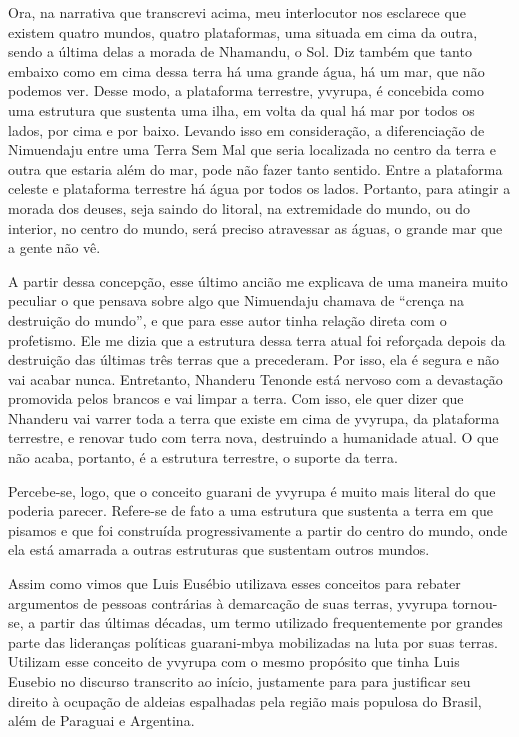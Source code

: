 \documentclass{article}
\begin{document}
Ora, na narrativa que transcrevi acima, meu interlocutor nos esclarece
que existem quatro mundos, quatro plataformas, uma situada em cima da
outra, sendo a \'ultima delas a morada de Nhamandu, o Sol. Diz tamb\'em
que tanto embaixo como em cima dessa terra h\'a uma grande \'agua, h\'a
um mar, que n\~ao podemos ver. Desse modo, a plataforma terrestre,
yvyrupa, \'e concebida como uma estrutura que sustenta uma ilha, em
volta da qual h\'a mar por todos os lados, por cima e por baixo.
Levando isso em considera\c{c}\~ao, a diferencia\c{c}\~ao de Nimuendaju
entre uma Terra Sem Mal que seria localizada no centro da terra e outra
que estaria al\'em do mar, pode n\~ao fazer tanto sentido. Entre a
plataforma celeste e plataforma terrestre h\'a \'agua por todos os
lados. Portanto, para atingir a morada dos deuses, seja saindo do
litoral, na extremidade do mundo, ou do interior, no centro do mundo,
ser\'a preciso atravessar as \'aguas, o grande mar que a gente n\~ao
v\^e.

A partir dessa concep\c{c}\~ao, esse \'ultimo anci\~ao me explicava de
uma maneira muito peculiar o que pensava sobre algo que Nimuendaju
chamava de {\textquotedblleft}cren\c{c}a na destrui\c{c}\~ao do
mundo{\textquotedblright}, e que para esse autor tinha rela\c{c}\~ao
direta com o profetismo. Ele me dizia que a estrutura dessa terra atual
foi refor\c{c}ada depois da destrui\c{c}\~ao das \'ultimas tr\^es
terras que a precederam. Por isso, ela \'e segura e n\~ao vai acabar
nunca. Entretanto, Nhanderu Tenonde est\'a nervoso com a
devasta\c{c}\~ao promovida pelos brancos e vai limpar a terra. Com
isso, ele quer dizer que Nhanderu vai varrer toda a terra que existe em
cima de yvyrupa, da plataforma terrestre, e renovar tudo com terra
nova, destruindo a humanidade atual. O que n\~ao acaba, portanto, \'e a
estrutura terrestre, o suporte da terra. 

Percebe-se, logo, que o conceito guarani de yvyrupa \'e muito mais
literal do que poderia parecer. Refere-se de fato a uma estrutura que
sustenta a terra em que pisamos e que foi constru\'ida progressivamente
a partir do centro do mundo, onde ela est\'a amarrada a outras
estruturas que sustentam outros mundos.

Assim como vimos que Luis Eus\'ebio utilizava esses conceitos para
rebater argumentos de pessoas contr\'arias \`a demarca\c{c}\~ao de suas
terras, yvyrupa tornou-se, a partir das \'ultimas d\'ecadas, um termo
utilizado frequentemente por grandes parte das lideran\c{c}as
pol\'iticas guarani-mbya mobilizadas na luta por suas terras. Utilizam
esse conceito de yvyrupa com o mesmo prop\'osito que tinha Luis Eusebio
no discurso transcrito ao in\'icio, justamente para para justificar seu
direito \`a ocupa\c{c}\~ao de aldeias espalhadas pela regi\~ao mais
populosa do Brasil, al\'em de Paraguai e Argentina.
\end{document}
